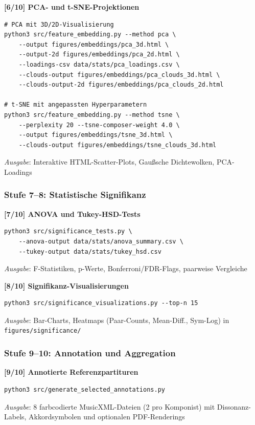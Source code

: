 \documentclass[10pt,a4paper]{article}
\theoremstyle{definition}
\begin{document}
\textbf{[6/10] PCA- und t-SNE-Projektionen}
\begin{lstlisting}
# PCA mit 3D/2D-Visualisierung
python3 src/feature_embedding.py --method pca \
    --output figures/embeddings/pca_3d.html \
    --output-2d figures/embeddings/pca_2d.html \
    --loadings-csv data/stats/pca_loadings.csv \
    --clouds-output figures/embeddings/pca_clouds_3d.html \
    --clouds-output-2d figures/embeddings/pca_clouds_2d.html

# t-SNE mit angepassten Hyperparametern
python3 src/feature_embedding.py --method tsne \
    --perplexity 20 --tsne-composer-weight 4.0 \
    --output figures/embeddings/tsne_3d.html \
    --clouds-output figures/embeddings/tsne_clouds_3d.html
\end{lstlisting}
\textit{Ausgabe}: Interaktive HTML-Scatter-Plots, Gaußsche Dichtewolken, PCA-Loadings

\subsubsection{Stufe 7--8: Statistische Signifikanz}

\textbf{[7/10] ANOVA und Tukey-HSD-Tests}
\begin{lstlisting}
python3 src/significance_tests.py \
    --anova-output data/stats/anova_summary.csv \
    --tukey-output data/stats/tukey_hsd.csv
\end{lstlisting}
\textit{Ausgabe}: F-Statistiken, p-Werte, Bonferroni/FDR-Flags, paarweise Vergleiche

\textbf{[8/10] Signifikanz-Visualisierungen}
\begin{lstlisting}
python3 src/significance_visualizations.py --top-n 15
\end{lstlisting}
\textit{Ausgabe}: Bar-Charts, Heatmaps (Paar-Counts, Mean-Diff., Sym-Log) in \newline\texttt{figures/significance/}

\subsubsection{Stufe 9--10: Annotation und Aggregation}

\textbf{[9/10] Annotierte Referenzpartituren}
\begin{lstlisting}
python3 src/generate_selected_annotations.py
\end{lstlisting}
\textit{Ausgabe}: 8 farbcodierte MusicXML-Dateien (2 pro Komponist) mit Dissonanz-Labels, Akkordsymbolen und optionalen PDF-Renderings
\end{document}
